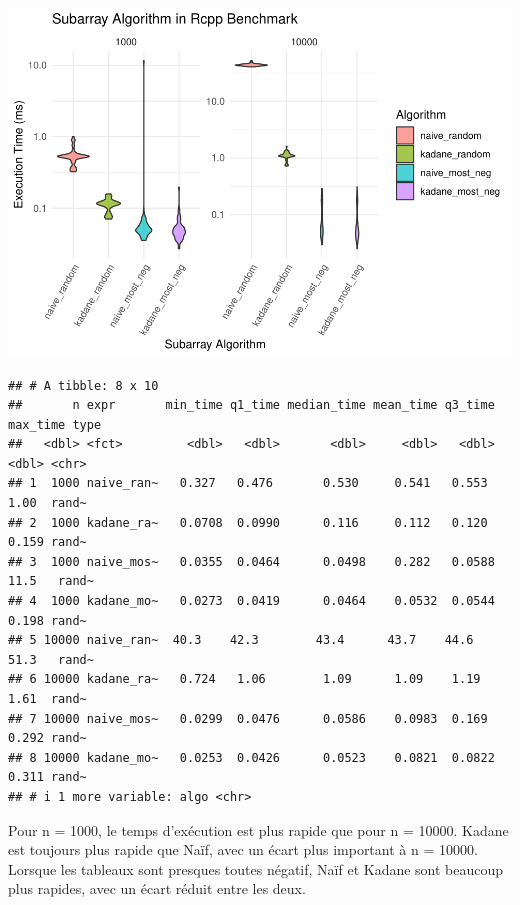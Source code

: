 \documentclass[
]{article}
\begin{document}
\includegraphics{MaxSubarray1D_files/figure-latex/benchmark4-1.pdf}

\begin{verbatim}
## # A tibble: 8 x 10
##       n expr       min_time q1_time median_time mean_time q3_time max_time type 
##   <dbl> <fct>         <dbl>   <dbl>       <dbl>     <dbl>   <dbl>    <dbl> <chr>
## 1  1000 naive_ran~   0.327   0.476       0.530     0.541   0.553     1.00  rand~
## 2  1000 kadane_ra~   0.0708  0.0990      0.116     0.112   0.120     0.159 rand~
## 3  1000 naive_mos~   0.0355  0.0464      0.0498    0.282   0.0588   11.5   rand~
## 4  1000 kadane_mo~   0.0273  0.0419      0.0464    0.0532  0.0544    0.198 rand~
## 5 10000 naive_ran~  40.3    42.3        43.4      43.7    44.6      51.3   rand~
## 6 10000 kadane_ra~   0.724   1.06        1.09      1.09    1.19      1.61  rand~
## 7 10000 naive_mos~   0.0299  0.0476      0.0586    0.0983  0.169     0.292 rand~
## 8 10000 kadane_mo~   0.0253  0.0426      0.0523    0.0821  0.0822    0.311 rand~
## # i 1 more variable: algo <chr>
\end{verbatim}

Pour n = 1000, le temps d'exécution est plus rapide que pour n = 10000.
Kadane est toujours plus rapide que Naïf, avec un écart plus important à
n = 10000. Lorsque les tableaux sont presques toutes négatif, Naïf et
Kadane sont beaucoup plus rapides, avec un écart réduit entre les deux.
\end{document}
